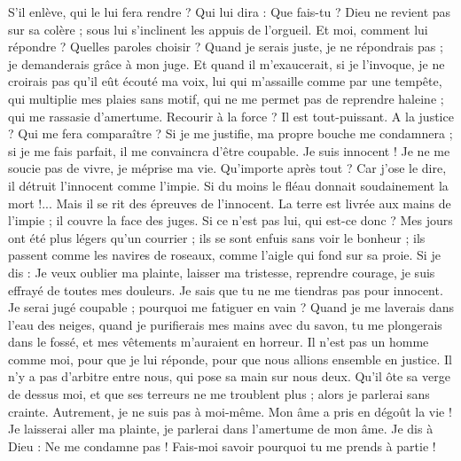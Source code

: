 \begin{multicols}{2}
S'il enlève, qui le lui fera rendre ? Qui lui dira : Que fais-tu ?
Dieu ne revient pas sur sa colère ; sous lui s'inclinent les appuis de l'orgueil.
Et moi, comment lui répondre ? Quelles paroles choisir ?
Quand je serais juste, je ne répondrais pas ; je demanderais grâce à mon juge.
Et quand il m'exaucerait, si je l'invoque, je ne croirais pas qu'il eût écouté ma voix,
lui qui m'assaille comme par une tempête, qui multiplie mes plaies sans motif,
qui ne me permet pas de reprendre haleine ; qui me rassasie d'amertume.
Recourir à la force ? Il est tout-puissant. A la justice ? Qui me fera comparaître ?
Si je me justifie, ma propre bouche me condamnera ; si je me fais parfait, il me convaincra d'être coupable.
Je suis innocent ! Je ne me soucie pas de vivre, je méprise ma vie.
Qu'importe après tout ? Car j'ose le dire, il détruit l'innocent comme l'impie.
Si du moins le fléau donnait soudainement la mort !... Mais il se rit des épreuves de l'innocent.
La terre est livrée aux mains de l'impie ; il couvre la face des juges. Si ce n'est pas lui, qui est-ce donc ?
Mes jours ont été plus légers qu'un courrier ; ils se sont enfuis sans voir le bonheur ;
ils passent comme les navires de roseaux, comme l'aigle qui fond sur sa proie.
Si je dis : Je veux oublier ma plainte, laisser ma tristesse, reprendre courage,
je suis effrayé de toutes mes douleurs. Je sais que tu ne me tiendras pas pour innocent.
Je serai jugé coupable ; pourquoi me fatiguer en vain ?
Quand je me laverais dans l'eau des neiges, quand je purifierais mes mains avec du savon,
tu me plongerais dans le fossé, et mes vêtements m'auraient en horreur.
Il n'est pas un homme comme moi, pour que je lui réponde, pour que nous allions ensemble en justice.
Il n'y a pas d'arbitre entre nous, qui pose sa main sur nous deux.
Qu'il ôte sa verge de dessus moi, et que ses terreurs ne me troublent plus ;
alors je parlerai sans crainte. Autrement, je ne suis pas à moi-même.
\VerseOne{}Mon âme a pris en dégoût la vie ! Je laisserai aller ma plainte, je parlerai dans l'amertume de mon âme.
Je dis à Dieu : Ne me condamne pas ! Fais-moi savoir pourquoi tu me prends à partie !

\end{multicols}
